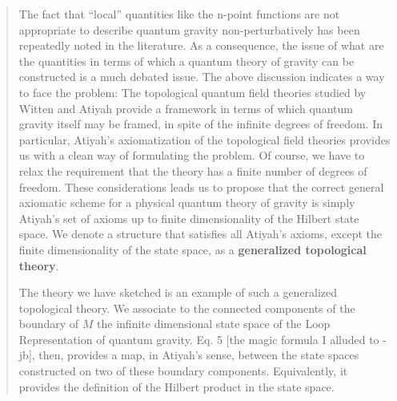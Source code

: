 \documentclass{article}
\begin{document}
\begin{quote}
The fact that ``local'' quantities like the n-point functions are not
appropriate to describe quantum gravity non-perturbatively has been
repeatedly noted in the literature. As a consequence, the issue of what
are the quantities in terms of which a quantum theory of gravity can be
constructed is a much debated issue. The above discussion indicates a
way to face the problem: The topological quantum field theories studied
by Witten and Atiyah provide a framework in terms of which quantum
gravity itself may be framed, in spite of the infinite degrees of
freedom. In particular, Atiyah's axiomatization of the topological field
theories provides us with a clean way of formulating the problem. Of
course, we have to relax the requirement that the theory has a finite
number of degrees of freedom. These considerations leads us to propose
that the correct general axiomatic scheme for a physical quantum theory
of gravity is simply Atiyah's set of axioms up to finite dimensionality
of the Hilbert state space. We denote a structure that satisfies all
Atiyah's axioms, except the finite dimensionality of the state space, as
a \textbf{generalized topological theory}.

The theory we have sketched is an example of such a generalized
topological theory. We associate to the connected components of the
boundary of \(M\) the infinite dimensional state space of the Loop
Representation of quantum gravity. Eq. 5 {[}the magic formula I alluded
to - jb{]}, then, provides a map, in Atiyah's sense, between the state
spaces constructed on two of these boundary components. Equivalently, it
provides the definition of the Hilbert product in the state space.


\end{quote}
\end{document}
